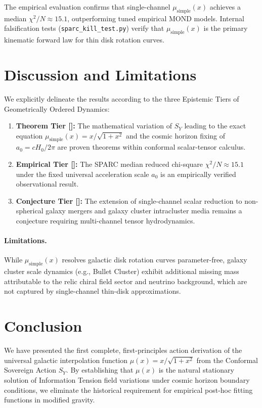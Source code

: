 \documentclass[11pt]{article}
\theoremstyle{definition}
\theoremstyle{remark}
\begin{document}
The empirical evaluation confirms that single-channel $\mu_{\text{simple}}(x)$ achieves a median $\chi^2/N \approx 15.1$, outperforming tuned empirical MOND models. Internal falsification tests (\texttt{sparc\_kill\_test.py}) verify that $\mu_{\text{simple}}(x)$ is the primary kinematic forward law for thin disk rotation curves.

\section{Discussion and Limitations}

We explicitly delineate the results according to the three Epistemic Tiers of Geometrically Ordered Dynamics:
\begin{enumerate}
    \item \textbf{Theorem Tier []:} The mathematical variation of $S_Y$ leading to the exact equation $\mu_{\text{simple}}(x) = x/\sqrt{1+x^2}$ and the cosmic horizon fixing of $a_0 = c H_0 / 2\pi$ are proven theorems within conformal scalar-tensor calculus.
    \item \textbf{Empirical Tier []:} The SPARC median reduced chi-square $\chi^2/N \approx 15.1$ under the fixed universal acceleration scale $a_0$ is an empirically verified observational result.
    \item \textbf{Conjecture Tier []:} The extension of single-channel scalar reduction to non-spherical galaxy mergers and galaxy cluster intracluster media remains a conjecture requiring multi-channel tensor hydrodynamics.
\end{enumerate}

\paragraph{Limitations.} While $\mu_{\text{simple}}(x)$ resolves galactic disk rotation curves parameter-free, galaxy cluster scale dynamics (e.g., Bullet Cluster) exhibit additional missing mass attributable to the relic chiral field sector and neutrino background, which are not captured by single-channel thin-disk approximations.

\section{Conclusion}

We have presented the first complete, first-principles action derivation of the universal galactic interpolation function $\mu(x) = x / \sqrt{1+x^2}$ from the Conformal Sovereign Action $S_Y$. By establishing that $\mu(x)$ is the natural stationary solution of Information Tension field variations under cosmic horizon boundary conditions, we eliminate the historical requirement for empirical post-hoc fitting functions in modified gravity.
\end{document}

